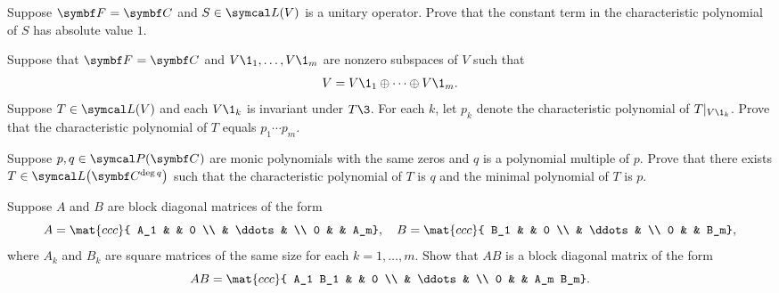 \begin{exercises}
\exercise
Suppose $\F{} = \C{}$ and $S \in \L(V)$ is a unitary operator. Prove that the constant term in the characteristic polynomial of $S$ has absolute value $1$.

\exercise
Suppose that $\F{} = \C{}$ and $V\1_1, \dots, V\1_m$ are nonzero subspaces of $V$ such that
\[
V = V\1_1 \oplus \dots \oplus V\1_m.
\]
Suppose $T \in \L(V)$ and each $V\1_k$ is invariant under $T\3$. For each $k$, let $p_k$ denote the characteristic polynomial of $T|_{V\1_k}$. Prove that
the characteristic polynomial of $T$ equals $p_1 \dotsm p_m$.


\exercise
Suppose $p, q \in \P(\C{})$ are monic polynomials with the same zeros and $q$ is a polynomial multiple of $p$. Prove that there exists $T \in \L\paren[\big]{\C{\deg q}}$ such that the characteristic polynomial of $T$ is $q$ and the minimal polynomial of $T$ is $p$.


\exercise
Suppose $A$ and $B$ are block diagonal matrices of the form\label{blockmult}
\[
A = \mat{ccc}{
A_1 & & 0 \\
& \ddots & \\
0 & & A_m},
\quad B = \mat{ccc}{
B_1 & & 0 \\
& \ddots & \\
0 & & B_m},
\]
where $A_k$ and $B_k$ are square matrices of the same size for each $k = 1, \dots, m$. Show that $AB$ is a
block diagonal matrix of the form
\[
AB = \mat{ccc}{
A_1 B_1 & & 0 \\
& \ddots & \\
0 & & A_m B_m}.
\]



\end{exercises}

